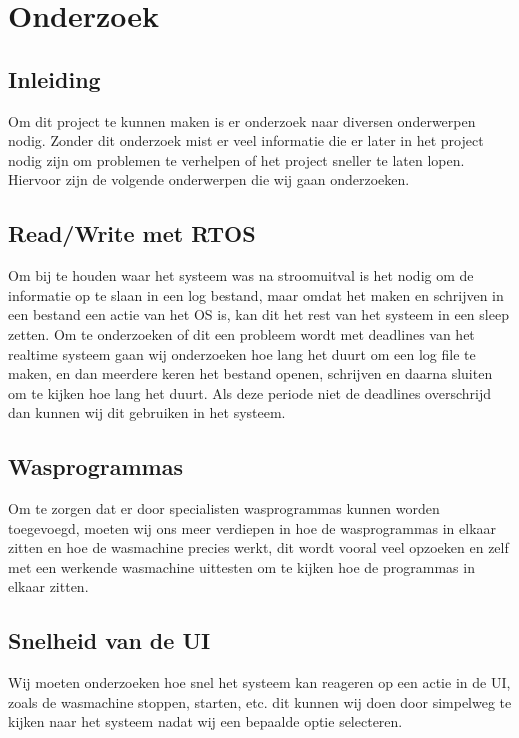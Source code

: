 \chapter{Onderzoek}
\section{Inleiding}
Om dit project te kunnen maken is er onderzoek naar diversen onderwerpen nodig. Zonder dit onderzoek mist er veel informatie die er later in het project nodig zijn om problemen te verhelpen of het project sneller te laten lopen.
Hiervoor zijn de volgende onderwerpen die wij gaan onderzoeken.

\section{Read/Write met RTOS}
Om bij te houden waar het systeem was na stroomuitval is het nodig om de informatie op te slaan in een log bestand, maar omdat het maken en schrijven in een 
bestand een actie van het OS is, kan dit het rest van het systeem in een sleep zetten. Om te onderzoeken of dit een probleem wordt met deadlines van het realtime systeem gaan wij 
onderzoeken hoe lang het duurt om een log file te maken, en dan meerdere keren het bestand openen, schrijven en daarna sluiten om te kijken hoe lang het duurt. Als deze periode niet de 
deadlines overschrijd dan kunnen wij dit gebruiken in het systeem.

\section{Wasprogrammas}
Om te zorgen dat er door specialisten wasprogrammas kunnen worden toegevoegd, moeten wij ons meer verdiepen in hoe de wasprogrammas in elkaar zitten en hoe de 
wasmachine precies werkt, dit wordt vooral veel opzoeken en zelf met een werkende wasmachine uittesten om te kijken hoe de programmas in elkaar zitten.

\section{Snelheid van de UI}
Wij moeten onderzoeken hoe snel het systeem kan reageren op een actie in de UI, zoals de wasmachine stoppen, starten, etc. dit kunnen wij doen door simpelweg te 
kijken naar het systeem nadat wij een bepaalde optie selecteren. 

